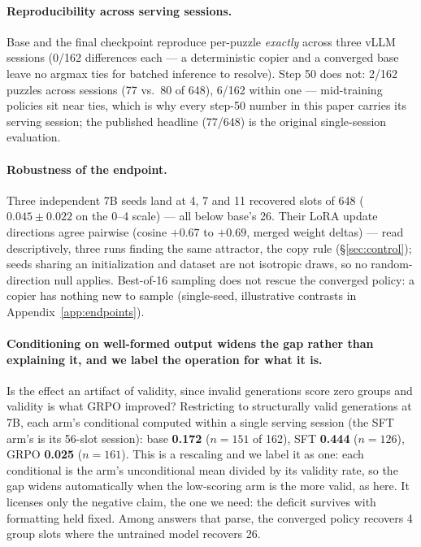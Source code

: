 \documentclass{article}
\begin{document}
\paragraph{Reproducibility across serving sessions.} Base and the final
checkpoint reproduce per-puzzle \emph{exactly} across three vLLM sessions
(0/162 differences each --- a deterministic copier and a converged base
leave no argmax ties for batched inference to resolve). Step 50 does not:
2/162 puzzles across sessions (77 vs.\ 80 of 648), 6/162 within one ---
mid-training policies sit near ties, which is why every step-50 number in
this paper carries its serving session; the published headline (77/648) is
the original single-session evaluation.

\paragraph{Robustness of the endpoint.} Three independent 7B seeds land at
4, 7 and 11 recovered slots of 648 ($0.045 \pm 0.022$ on the 0--4 scale) ---
all below base's 26. Their LoRA update directions agree pairwise (cosine
$+0.67$ to $+0.69$, merged weight deltas) --- read descriptively, three
runs finding the same attractor, the copy rule (\S\ref{sec:control}); seeds
sharing an initialization and dataset are not isotropic draws, so no
random-direction null applies. Best-of-16 sampling does not rescue the
converged policy: a copier has nothing new to sample (single-seed,
illustrative contrasts in Appendix~\ref{app:endpoints}).

\paragraph{Conditioning on well-formed output widens the gap rather than
explaining it, and we label the operation for what it is.} Is the effect an
artifact of validity, since invalid generations score zero groups and
validity is what GRPO improved? Restricting to
structurally valid generations at 7B, each arm's conditional computed within
a single serving session (the SFT arm's is its 56-slot session): base
\textbf{0.172} ($n=151$ of 162),
SFT \textbf{0.444} ($n=126$), GRPO \textbf{0.025} ($n=161$). This is a
rescaling and we label it as one: each conditional is the arm's
unconditional mean divided by its validity rate, so the gap widens
automatically when the low-scoring arm is the more valid, as here. It
licenses only the negative claim, the one we need: the deficit survives
with formatting held fixed.
Among answers that parse, the converged policy recovers 4 group slots where
the untrained model recovers 26.
\end{document}

